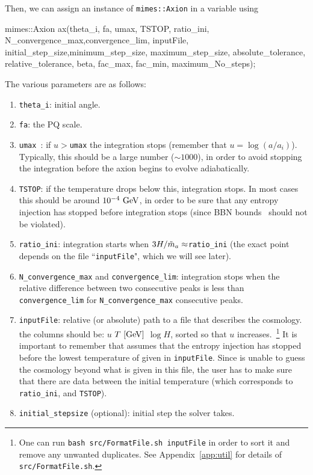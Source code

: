 \documentclass[11pt,a4paper]{article}
\begin{document}
Then, we can assign an instance of {\tt mimes::Axion} in a variable using
%
\begin{cpp}
	mimes::Axion ax(theta_i, fa, umax, TSTOP, ratio_ini, N_convergence_max,convergence_lim,
	inputFile, initial_step_size,minimum_step_size, maximum_step_size, absolute_tolerance, 
	relative_tolerance, beta, fac_max, fac_min, maximum_No_steps);
\end{cpp}
%
The various parameters are as follows:
%
\begin{enumerate}
	\item {\tt theta\_i}: initial angle.
	\item {\tt fa}: the PQ scale.
	\item {\tt umax }: if $u>${\tt umax} the integration stops (remember that $u=\log(a/a_i)$). Typically, this should be a large number ($\sim 1000$), in order to avoid stopping the integration before the axion begins to evolve  adiabatically.    
	\item {\tt TSTOP}: if the temperature drops below this, integration stops. In most cases this should be around 
	$10^{-4}~{\rm GeV}$, in order to be sure that any entropy injection has stopped before integration stops (since BBN bounds~\cite{Kolb:206230,Peebles:1993} should not be violated).
	\item {\tt ratio\_ini}: integration starts when $3H/\tilde m_{a}{} \approx${\tt ratio\_ini} (the exact point depends on the file ``{\tt inputFile}", which we will see later). 
	\item  {\tt N\_convergence\_max} and {\tt convergence\_lim}: integration stops when the relative difference 
	between two consecutive peaks is less than {\tt convergence\_lim} for {\tt N\_convergence\_max} 
	consecutive peaks.
	\item  {\tt inputFile}: relative (or absolute) path to a file that describes the cosmology. the columns should be: $u$ $T ~[{\rm GeV}]$ $\log H$, sorted so that $u$ increases.~\footnote{One can run {\tt bash src/FormatFile.sh inputFile} in order to sort it and remove any unwanted duplicates. See Appendix~\ref{app:util} for details of {\tt src/FormatFile.sh}.}
	It is important to remember that \mimes assumes that the entropy injection has stopped before the lowest temperature of given in {\tt inputFile}. Since \mimes is unable to guess the cosmology beyond what is given in this file, the user has to make sure that there are data between the initial temperature (which corresponds to {\tt ratio\_ini}, and {\tt TSTOP}).
	
	\item {\tt initial\_stepsize} (optional): initial step the solver takes. 
	

\end{enumerate}
\end{document}
